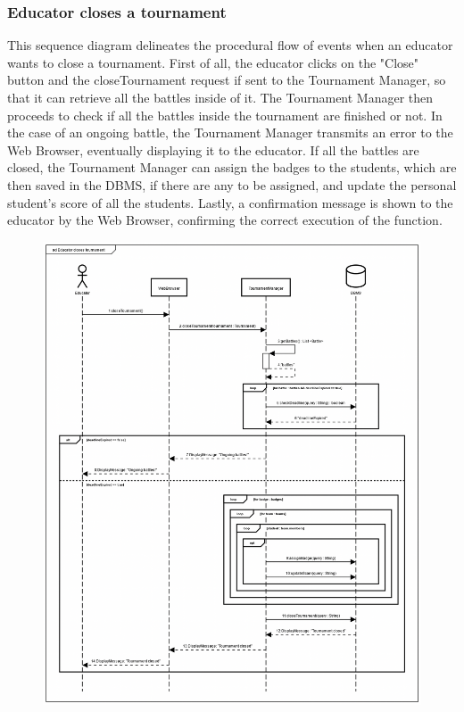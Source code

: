 \documentclass[12pt,oneside,a4paper]{article}
\begin{document}
\subsubsection{Educator closes a tournament}
This sequence diagram delineates the procedural flow of events when an educator wants to close a tournament. First of all, the educator clicks on the "Close" button and the closeTournament request if sent to the Tournament Manager, so that it can retrieve all the battles inside of it. The Tournament Manager then proceeds to check if all the battles inside the tournament are finished or not. In the case of an ongoing battle, the Tournament Manager transmits an error to the Web Browser, eventually displaying it to the educator. If all the battles are closed, the Tournament Manager can assign the badges to the students, which are then saved in the DBMS, if there are any to be assigned, and update the personal student's score of all the students. Lastly, a confirmation message is shown to the educator by the Web Browser, confirming the correct execution of the function.
\begin{figure}[htbp]
    \centering
    \includegraphics[width=1\linewidth]{Images/Sequence Diagrams/CloseTournament.png}
    \label{fig:enter-label}
\end{figure}
\end{document}
